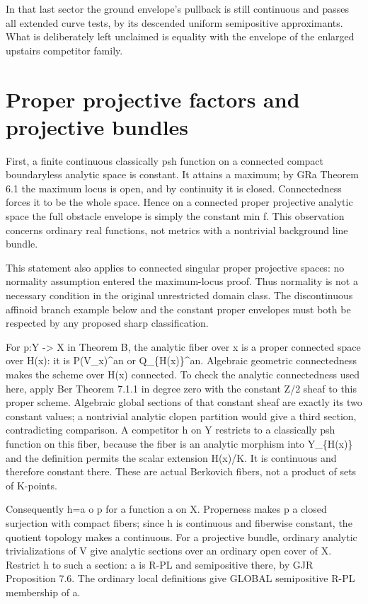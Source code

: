 \documentclass[11pt]{article}
\begin{document}
In that last sector the ground envelope's pullback is still continuous and passes all extended curve tests, by its descended uniform semipositive approximants. What is deliberately left unclaimed is equality with the envelope of the enlarged upstairs competitor family.

\section{Proper projective factors and projective bundles}

First, a finite continuous classically psh function on a connected compact boundaryless analytic space is constant. It attains a maximum; by GRa Theorem 6.1 the maximum locus is open, and by continuity it is closed. Connectedness forces it to be the whole space. Hence on a connected proper projective analytic space the full obstacle envelope is simply the constant min f. This observation concerns ordinary real functions, not metrics with a nontrivial background line bundle.

This statement also applies to connected singular proper projective spaces: no normality assumption entered the maximum-locus proof. Thus normality is not a necessary condition in the original unrestricted domain class. The discontinuous affinoid branch example below and the constant proper envelopes must both be respected by any proposed sharp classification.

For p:Y -> X in Theorem B, the analytic fiber over x is a proper connected space over H(x): it is P(V\_x)\textasciicircum{}an or Q\_\{H(x)\}\textasciicircum{}an. Algebraic geometric connectedness makes the scheme over H(x) connected. To check the analytic connectedness used here, apply Ber Theorem 7.1.1 in degree zero with the constant Z/2 sheaf to this proper scheme. Algebraic global sections of that constant sheaf are exactly its two constant values; a nontrivial analytic clopen partition would give a third section, contradicting comparison. A competitor h on Y restricts to a classically psh function on this fiber, because the fiber is an analytic morphism into Y\_\{H(x)\} and the definition permits the scalar extension H(x)/K. It is continuous and therefore constant there. These are actual Berkovich fibers, not a product of sets of K-points.

Consequently h=a o p for a function a on X. Properness makes p a closed surjection with compact fibers; since h is continuous and fiberwise constant, the quotient topology makes a continuous. For a projective bundle, ordinary analytic trivializations of V give analytic sections over an ordinary open cover of X. Restrict h to such a section: a is R-PL and semipositive there, by GJR Proposition 7.6. The ordinary local definitions give GLOBAL semipositive R-PL membership of a.
\end{document}
